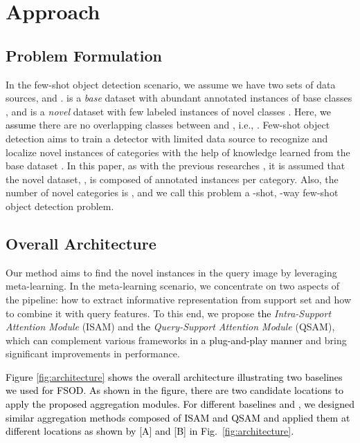 \documentclass[10pt,twocolumn,letterpaper]{article}
\newcommand{\nj}[1]{\textcolor{black}{#1}}
\newcommand{\hj}[1]{\textcolor{black}{#1}}
\begin{document}
\section{Approach}
\label{sec:approach}
\subsection{Problem Formulation}
\label{sec:problem formulation}
In the few-shot object detection scenario, we assume we have two sets of data sources,  and .  is a \textit{base} dataset with abundant annotated instances of base classes , and  is a \textit{novel} dataset with few labeled instances of novel classes . Here, \nj{we assume} there are no overlapping classes between  and , i.e., . Few-shot object detection aims to train a detector with limited data source  to recognize and localize novel instances of categories  with the help of knowledge learned from the base dataset .
In this paper, as with the previous researches \cite{li2019few, kang2019few, xiao2020few, wang2020frustratingly}, it is assumed that the novel dataset, , is composed of  annotated instances per category. Also, the number of novel categories is , and we call this problem a -shot, -way few-shot object detection problem. 




\subsection{Overall Architecture}
\label{subsec:overall}

Our method aims to find the novel instances in the query image by leveraging meta-learning. In the meta-learning scenario, we concentrate on two aspects of the pipeline: how to extract informative representation from support set  and how to combine it with query features. To this end, we propose \nj{the} \textit{Intra-Support Attention Module} (ISAM) and \nj{the} \textit{Query-Support Attention Module} (QSAM), which \nj{can} complement various frameworks \nj{in a plug-and-play manner} and bring significant improvements in performance. 

\hj{Figure \ref{fig:architecture} shows the overall architecture illustrating two baselines \cite{fan2020fsod, xiao2020few} we used \nj{for FSOD}. As shown in the figure, there are two candidate \nj{locations} to apply the \nj{proposed} aggregation \nj{modules}. \nj{For different baselines \cite{fan2020fsod} and \cite{xiao2020few}, we designed similar aggregation methods composed of ISAM and QSAM and applied them at different locations as shown by [A] and [B] in Fig.~\ref{fig:architecture}}.} 
\end{document}
